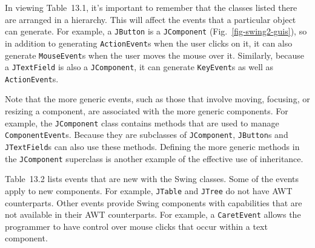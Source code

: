 In viewing Table~13.1, it's important to remember that the
classes listed there are arranged in a hierarchy.  This will affect the
events that a particular object can generate.  For example, a
{\tt JButton} is a {\tt JComponent} (Fig.~\ref{fig-swing2-guis}), so in addition
to generating {\tt ActionEvent}s when the user clicks on it, it can
also generate {\tt MouseEvent}s when the user moves the mouse over
it.   Similarly, because a {\tt JTextField} is also a {\tt JComponent},
it can generate {\tt KeyEvent}s as well as {\tt ActionEvent}s.

Note that the more generic events, such as those that involve moving,
focusing, or resizing a component, are associated with the more
generic components.  For example, the {\tt JComponent} class contains
methods that are used to manage {\tt ComponentEvent}s.  Because they
are subclasses of {\tt JComponent}, {\tt JButton}s and {\tt
JTextField}s can also use these methods.  Defining the more generic
methods in the {\tt JComponent} superclass is another example of the
effective use of inheritance.



Table~13.2 lists events that are new with the Swing
classes.  Some of the events apply to new components.  For example,
{\tt JTable} and {\tt JTree} do not have AWT counterparts.  Other events
provide Swing components with capabilities that are not available in
their AWT counterparts.   For example, a {\tt CaretEvent} allows the
programmer to have control over mouse clicks that occur within a
text component.

